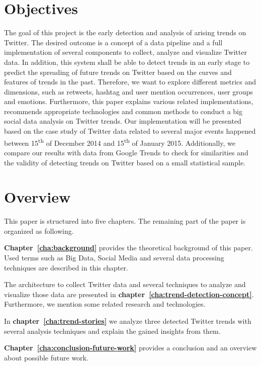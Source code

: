 \section{Objectives}
\label{sec:objectives}
The goal of this project is the early detection and analysis of arising trends on Twitter. The desired outcome is a concept of a data pipeline and a full implementation of several components to collect, analyze and visualize Twitter data. In addition, this system shall be able to detect trends in an early stage to predict the spreading of future trends on Twitter based on the curves and features of trends in the past. Therefore, we want to explore different metrics and dimensions, such as retweets, hashtag and user mention occurrences, user groups and emotions. Furthermore, this paper explains various related implementations, recommends appropriate technologies and common methods to conduct a big social data analysis on Twitter trends. Our implementation will be presented based on the case study of Twitter data related to several major events happened between 15\textsuperscript{th} of December 2014 and 15\textsuperscript{th} of January 2015.
Additionally, we compare our results with data from Google Trends to check for similarities and the validity of detecting trends on Twitter based on a small statistical sample.

\clearpage
\section{Overview}
\label{sec:overview}
This paper is structured into five chapters. The remaining part of the paper is organized as following.

\textbf{Chapter~\ref{cha:background}} provides the theoretical background of this paper. Used terms such as Big Data, Social Media and several data processing techniques are described in this chapter.

The architecture to collect Twitter data and several techniques to analyze and visualize those data are presented in \textbf{chapter~\ref{cha:trend-detection-concept}}. Furthermore, we mention some related research and technologies.

In \textbf{chapter~\ref{cha:trend-stories}} we analyze three detected Twitter trends with several analysis techniques and explain the gained insights from them.

\textbf{Chapter~\ref{cha:conclusion-future-work}} provides a conclusion and an overview about possible future work.
